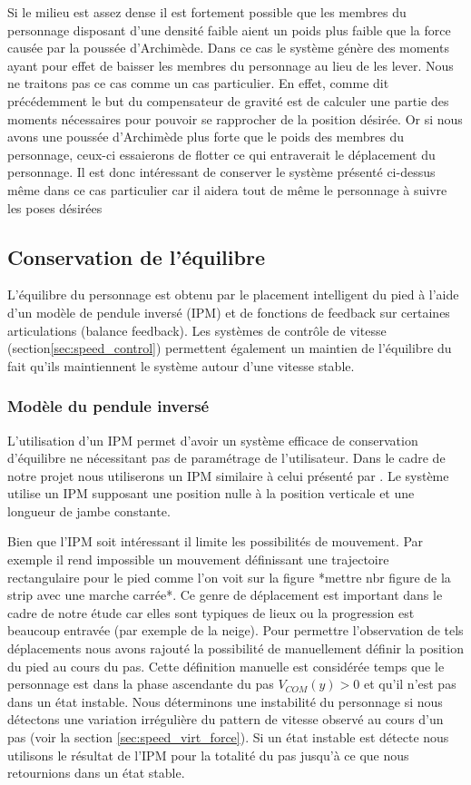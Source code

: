 \documentclass{llncs}
\begin{document}
Si le milieu est assez dense il est fortement possible que les membres du personnage disposant d'une densité faible aient un poids plus faible que la force causée par la poussée d'Archimède. Dans ce cas le système génère des moments ayant pour effet de baisser les membres du personnage au lieu de les lever. Nous ne traitons pas ce cas comme un cas particulier. En effet, comme dit précédemment le but du compensateur de gravité est de calculer une partie des moments nécessaires pour pouvoir se rapprocher de la position désirée. Or si nous avons une poussée d'Archimède plus forte que le poids des membres du personnage, ceux-ci essaierons de flotter ce qui entraverait le déplacement du personnage. Il est donc intéressant de conserver le système présenté ci-dessus même dans ce cas particulier car il aidera tout de même le personnage à suivre les poses désirées
\subsection{Conservation de l'équilibre}
%
L'équilibre du personnage est obtenu par le placement intelligent du pied à l'aide d'un modèle de pendule inversé (IPM) et de fonctions de feedback sur certaines articulations (balance feedback). Les systèmes de contrôle de vitesse (section\ref{sec:speed_control}) permettent également un maintien de l'équilibre du fait qu'ils maintiennent le système autour d'une vitesse stable. 
%
\subsubsection{Modèle du pendule inversé}
%
\label{sec:IPM}
L'utilisation d'un IPM permet d'avoir un système efficace de conservation d'équilibre ne nécessitant pas de paramétrage de l'utilisateur. Dans le cadre de notre  projet nous utiliserons un IPM similaire à celui présenté par \cite{coros2010generalized}. Le système utilise un IPM supposant une position nulle à la position verticale et une longueur de jambe constante. 


Bien que l'IPM soit intéressant il limite les possibilités de mouvement. Par exemple il rend impossible un mouvement définissant une trajectoire rectangulaire pour le pied comme l'on voit sur la figure *mettre nbr figure de la strip avec une marche carrée*. Ce genre de déplacement est important dans le cadre de notre étude car elles sont typiques de lieux ou la progression est beaucoup entravée (par exemple de la neige). Pour permettre l'observation de tels déplacements nous avons rajouté la possibilité de manuellement définir la position du pied au cours du pas. Cette définition manuelle est considérée temps que le personnage est dans la phase ascendante du pas \(V_{COM}(y)>0\) et qu'il n'est pas dans un état instable. Nous déterminons une instabilité du personnage si nous détectons une variation irrégulière du pattern de vitesse observé au cours d'un pas (voir la section \ref{sec:speed_virt_force}). Si un état instable est détecte nous utilisons le résultat de l'IPM pour la totalité du pas jusqu'à ce que nous retournions dans un état stable.
%
\end{document}
